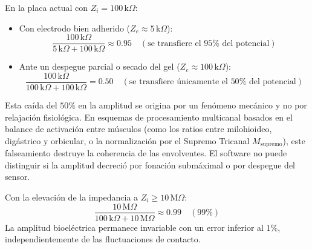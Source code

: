\documentclass[11pt,a4paper]{article}
\begin{document}
En la placa actual con $Z_i = 100\,\text{k}\Omega$:
\begin{itemize}
    \item Con electrodo bien adherido ($Z_e \approx 5\,\text{k}\Omega$):
    \begin{equation}
    \frac{100\,\text{k}\Omega}{5\,\text{k}\Omega + 100\,\text{k}\Omega} \approx 0.95 \quad (\text{se transfiere el } 95\% \text{ del potencial})
    \end{equation}
    \item Ante un despegue parcial o secado del gel ($Z_e \approx 100\,\text{k}\Omega$):
    \begin{equation}
    \frac{100\,\text{k}\Omega}{100\,\text{k}\Omega + 100\,\text{k}\Omega} = 0.50 \quad (\text{se transfiere únicamente el } 50\% \text{ del potencial})
    \end{equation}
\end{itemize}

Esta caída del $50\%$ en la amplitud se origina por un fenómeno mecánico y no por relajación fisiológica. En esquemas de procesamiento multicanal basados en el balance de activación entre músculos (como los ratios entre milohioideo, digástrico y orbicular, o la normalización por el Supremo Tricanal $M_{\text{supremo}}$), este falseamiento destruye la coherencia de las envolventes. El software no puede distinguir si la amplitud decreció por fonación submáximal o por despegue del sensor.

Con la elevación de la impedancia a $Z_i \ge 10\,\text{M}\Omega$:
\begin{equation}
\frac{10\,\text{M}\Omega}{100\,\text{k}\Omega + 10\,\text{M}\Omega} \approx 0.99 \quad (99\%)
\end{equation}
La amplitud bioeléctrica permanece invariable con un error inferior al $1\%$, independientemente de las fluctuaciones de contacto.
\end{document}

